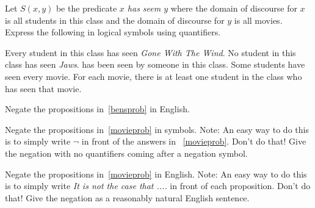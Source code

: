 \begin{prob}\label{movieprob}
Let $S(x,y)$ be the predicate {\itshape $x$ has seem $y$} where the domain of discourse for $x$
is all students in this class and the domain of discourse for $y$ is all movies. Express the following in logical symbols using quantifiers.
  \begin{tasks}
     \task Every student in this class has seen {\itshape Gone With The Wind}.
     \task No student in this class has seen {\itshape Jaws}.
      has been seen by someone in this class.
     \task Some students have seen every movie.
     \task For each movie, there is at least one student in the class who has seen that movie.
   \end{tasks}
\end{prob}

\begin{prob}
Negate the propositions in~\ref{bensprob} in English.
\end{prob}

\begin{prob}
Negate the propositions in~\ref{movieprob} in symbols. Note: An easy way to do this is to simply write $\lnot$
in front of the answers in ~\ref{movieprob}. Don't do that! Give the negation with no quantifiers coming after a negation symbol.
\end{prob}

\begin{prob}
Negate the propositions in~\ref{movieprob} in English. Note: An easy way to do this is to simply write {\itshape
It is not the case that ....} 
in front of each proposition. Don't do that! Give the negation as a reasonably natural English sentence.
\end{prob}

